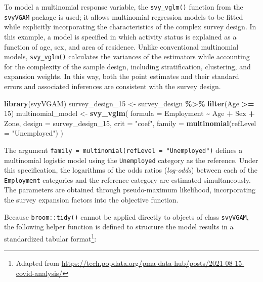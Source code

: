 \documentclass[
  english,
  12pt,
]{book}
\newenvironment{Shaded}{\begin{snugshade}}{\end{snugshade}}
\newcommand{\AttributeTok}[1]{\textcolor[rgb]{0.13,0.29,0.53}{#1}}
\newcommand{\DecValTok}[1]{\textcolor[rgb]{0.00,0.00,0.81}{#1}}
\newcommand{\FunctionTok}[1]{\textcolor[rgb]{0.13,0.29,0.53}{\textbf{#1}}}
\newcommand{\NormalTok}[1]{#1}
\newcommand{\OtherTok}[1]{\textcolor[rgb]{0.56,0.35,0.01}{#1}}
\newcommand{\SpecialCharTok}[1]{\textcolor[rgb]{0.81,0.36,0.00}{\textbf{#1}}}
\newcommand{\StringTok}[1]{\textcolor[rgb]{0.31,0.60,0.02}{#1}}
\begin{document}
To model a multinomial response variable, the \texttt{svy\_vglm()} function from the \texttt{svyVGAM} package \citep{svyVGAM2026} is used; it allows multinomial regression models to be fitted while explicitly incorporating the characteristics of the complex survey design. In this example, a model is specified in which activity status is explained as a function of age, sex, and area of residence. Unlike conventional multinomial models, \texttt{svy\_vglm()} calculates the variances of the estimators while accounting for the complexity of the sample design, including stratification, clustering, and expansion weights. In this way, both the point estimates and their standard errors and associated inferences are consistent with the survey design.

\begin{Shaded}
\begin{Highlighting}[]
\FunctionTok{library}\NormalTok{(svyVGAM)}
\NormalTok{survey\_design\_15 }\OtherTok{\textless{}{-}}\NormalTok{ survey\_design }\SpecialCharTok{\%\textgreater{}\%}
  \FunctionTok{filter}\NormalTok{(Age }\SpecialCharTok{\textgreater{}=} \DecValTok{15}\NormalTok{)}
\NormalTok{multinomial\_model }\OtherTok{\textless{}{-}} \FunctionTok{svy\_vglm}\NormalTok{(}
  \AttributeTok{formula =}\NormalTok{ Employment }\SpecialCharTok{\textasciitilde{}}\NormalTok{ Age }\SpecialCharTok{+}\NormalTok{ Sex }\SpecialCharTok{+}\NormalTok{ Zone,}
  \AttributeTok{design =}\NormalTok{ survey\_design\_15,}
  \AttributeTok{crit =} \StringTok{"coef"}\NormalTok{,}
  \AttributeTok{family =} \FunctionTok{multinomial}\NormalTok{(}\AttributeTok{refLevel =} \StringTok{"Unemployed"}\NormalTok{)}
\NormalTok{)}
\end{Highlighting}
\end{Shaded}

The argument \texttt{family\ =\ multinomial(refLevel\ =\ "Unemployed")} defines a multinomial logistic model using the \texttt{Unemployed} category as the reference. Under this specification, the logarithms of the odds ratios (\emph{log-odds}) between each of the \texttt{Employment} categories and the reference category are estimated simultaneously. The parameters are obtained through pseudo-maximum likelihood, incorporating the survey expansion factors into the objective function.

Because \texttt{broom::tidy()} cannot be applied directly to objects of class \texttt{svyVGAM}, the following helper function is defined to structure the model results in a standardized tabular format\footnote{Adapted from \url{https://tech.popdata.org/pma-data-hub/posts/2021-08-15-covid-analysis/}}:
\end{document}
